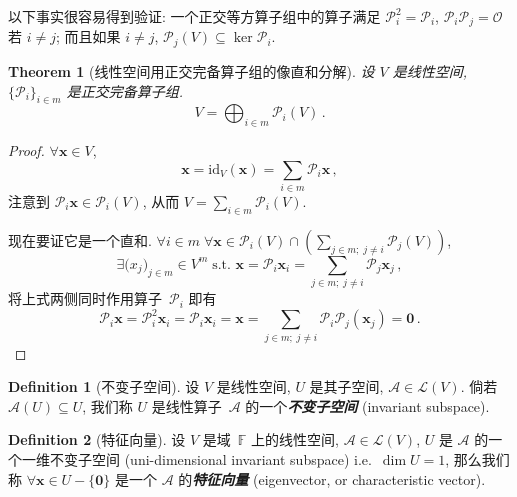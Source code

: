 \documentclass[openany]{ctexbook}
\newcommand*{\indexbf}[1]{\emph{\textbf{#1}}\index{#1}} %
\theoremstyle{plain}
\newtheorem{theorem}{Theorem}[section] %
\theoremstyle{definition}
\newtheorem{definition}{Definition}[section] %
\newcommand*{\bv}{\boldsymbol} %
\newcommand*{\id}{\mathrm{id}} %
\begin{document}
以下事实很容易得到验证:
一个正交等方算子组中的算子满足 $\mathscr P_i^2 = \mathscr P_i$, 
$\mathscr P_i \mathscr P_j = \mathscr O$ 若 $i \neq j$; 
而且如果 $i \neq j$, $\mathscr P_j(V) \subseteq \ker \mathscr P_i$.


\begin{theorem}[线性空间用正交完备算子组的像直和分解]
	设 $V$ 是线性空间, $\{\mathscr P_i\}_{i \in m}$ 是正交完备算子组.
	\begin{equation*}
		V = \bigoplus_{i \in m} \mathscr P_i(V)\,.
	\end{equation*}
\end{theorem}
\begin{proof}
	$\forall \bv x \in V$, 
	\begin{equation*}
		\bv x = \id_V(\bv x) = \sum_{i \in m} \mathscr P_i \bv x\,,
	\end{equation*}
	注意到 $\mathscr P_i \bv x \in \mathscr P_i(V)$, 从而 $V = \sum_{i \in m} \mathscr P_i(V)$.

	现在要证它是一个直和. $\forall i \in m\; \forall \bv x \in \mathscr P_i(V) \cap \left( \sum_{j \in m;\; j \neq i} \mathscr P_j(V)\right)$, 
	\begin{equation*}
		\exists \bv (x_j)_{j \in m} \in V^m  \;\text{s.t.\ }
			\bv x = \mathscr P_i \bv x_i = \sum_{j \in m;\; j \neq i} \mathscr P_j \bv x_j\,,
	\end{equation*}
	将上式两侧同时作用算子~$\mathscr P_i$ 即有
	\begin{equation*}
		\mathscr P_i \bv x = \mathscr P_i^2 \bv x_i = \mathscr P_i \bv x_i = \bv x = 
		\sum_{j \in m;\; j \neq i} \mathscr P_i \mathscr P_j (\bv x_j) = \bv 0\,.
	\end{equation*}
\end{proof}

\begin{definition}[不变子空间]
	设 $V$ 是线性空间, $U$ 是其子空间, $\mathscr A \in \mathcal L(V)$. 倘若 $\mathscr A(U) \subseteq U$, 我们称 $U$ 是线性算子~$\mathscr A$ 的一个\indexbf{不变子空间} (invariant subspace).
\end{definition}

\begin{definition}[特征向量]
	设 $V$ 是域~$\mathbb F$ 上的线性空间, $\mathscr A \in \mathcal L(V)$, $U$ 是 $\mathscr A$ 的一个一维不变子空间 (uni-dimensional invariant subspace) i.e.\ $\dim U = 1$, 那么我们称 $\forall \bv x \in U - \{\bv 0\}$ 是一个 $\mathscr A$ 的\indexbf{特征向量} (eigenvector, or characteristic vector).
\end{definition}
\end{document}
